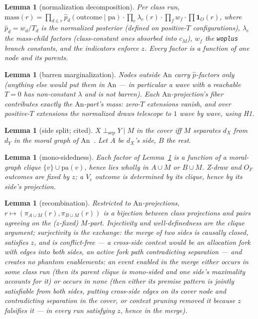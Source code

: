 \documentclass[11pt]{article}
\newcommand{\dsep}{\perp_{\mathrm{sep}}}
\newcommand{\An}{\mathrm{An}}
\newcommand{\pa}{\mathrm{pa}}
\newtheorem{lemma}[theorem]{Lemma}
\theoremstyle{definition}
\theoremstyle{remark}
\begin{document}
\begin{lemma}[normalization decomposition]
\label{lem:decomp}
Per class run,
$\mathrm{mass}(r) = \prod_{d\in r}\hat{p}_d(\mathrm{outcome}\mid\pa)
\cdot \prod_e \lambda_e(r) \cdot \prod_{f} w_f \cdot \prod \mathbf{1}_O(r)$,
where $\hat{p}_d = w_d/T_d$ is the normalized posterior (defined on
positive-$T$ configurations), $\lambda_e$ the mass-child factors
(class-constant ones absorbed into $c_M$), $w_f$ the \texttt{woplus}
branch constants, and the indicators enforce $z$.  Every factor is a
function of one node and its parents.
\end{lemma}

\begin{lemma}[barren marginalization]
\label{lem:barren}
Nodes outside $\An$ carry $\hat{p}$-factors only (anything else would
put them in $\An$ --- in particular a wave with a reachable $T=0$ has
non-constant $\lambda$ and is not barren).  Each $\An$-projection's
fiber contributes exactly the $\An$-part's mass: zero-$T$ extensions
vanish, and over positive-$T$ extensions the normalized draws
telescope to $1$ wave by wave, using H1.
\end{lemma}

\begin{lemma}[side split; cited]
\label{lem:moral}
$X \dsep Y \mid M$ in the cover iff $M$ separates $d_X$ from $d_Y$ in
the moral graph of $\An$~\cite{Lauritzen1996,VermaPearl1988}.  Let $A$
be $d_X$'s side, $B$ the rest.
\end{lemma}

\begin{lemma}[mono-sidedness]
\label{lem:mono}
Each factor of Lemma~\ref{lem:decomp} is a function of a moral-graph
clique $\{v\}\cup\pa(v)$, hence lies wholly in $A\cup M$ or $B\cup M$.
Z-draw and $O_F$ outcomes are fixed by $z$; a $V_e$ outcome is
determined by its clique, hence by its side's projection.
\end{lemma}

\begin{lemma}[recombination]
\label{lem:exchange}
Restricted to $\An$-projections, $r \mapsto (\pi_{A\cup M}(r),
\pi_{B\cup M}(r))$ is a bijection between class projections and pairs
agreeing on the ($z$-fixed) $M$-part.  Injectivity and
well-definedness are the clique argument; surjectivity is the
exchange: the merge of two sides is causally closed, satisfies $z$,
and is conflict-free --- a cross-side contest would be an allocation
fork with edges into both sides, an active fork path contradicting
separation --- and creates no phantom enablements: an event enabled in
the merge either occurs in some class run (then its parent clique is
mono-sided and one side's maximality accounts for it) or occurs in
none (then either its premise pattern is jointly satisfiable from
both sides, putting cross-side edges on its cover node and
contradicting separation in the cover, or context pruning removed it
because $z$ falsifies it --- in every run satisfying $z$, hence in
the merge).
\end{lemma}
\end{document}
